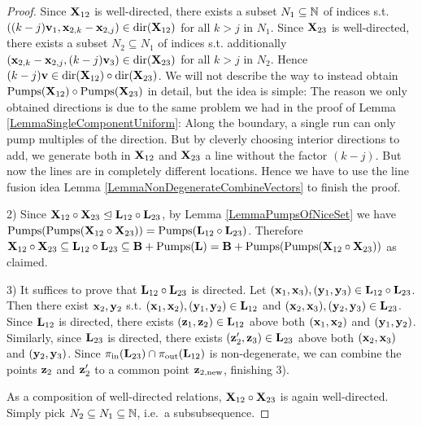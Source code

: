 \begin{proof}
Since \(\mathbf{X}_{12}\) is well-directed, there exists a subset \(N_1 \subseteq \mathbb{N}\) of indices s.t. \( ((k-j) \mathbf{v}_1, \mathbf{x}_{2,k}-\mathbf{x}_{2,j}) \in \operatorname{dir}(\mathbf{X}_{12})\) for all \(k>j\) in \(N_1\). Since \(\mathbf{X}_{23}\) is well-directed, there exists a subset \(N_2 \subseteq N_1\) of indices s.t. additionally \((\mathbf{x}_{2,k}-\mathbf{x}_{2,j}, (k-j) \mathbf{v}_3) \in \operatorname{dir}(\mathbf{X}_{23})\) for all \(k>j\) in \(N_2\). Hence \((k-j) \mathbf{v} \in \operatorname{dir}(\mathbf{X}_{12}) \circ \operatorname{dir}(\mathbf{X}_{23})\). We will not describe the way to instead obtain \(\operatorname{Pumps}(\mathbf{X}_{12}) \circ \operatorname{Pumps}(\mathbf{X}_{23})\) in detail, but the idea is simple: The reason we only obtained directions is due to the same problem we had in the proof of Lemma \ref{LemmaSingleComponentUniform}: Along the boundary, a single run can only pump multiples of the direction. But by cleverly choosing interior directions to add, we generate both in \(\mathbf{X}_{12}\) and \(\mathbf{X}_{23}\) a line without the factor \((k-j)\). But now the lines are in completely different locations. Hence we have to use the line fusion idea Lemma \ref{LemmaNonDegenerateCombineVectors} to finish the proof.



2) Since \(\mathbf{X}_{12} \circ \mathbf{X}_{23} \trianglelefteq \mathbf{L}_{12} \circ \mathbf{L}_{23}\), by Lemma \ref{LemmaPumpsOfNiceSet} we have \(\operatorname{Pumps}(\operatorname{Pumps}(\mathbf{X}_{12} \circ \mathbf{X}_{23}))=\operatorname{Pumps}(\mathbf{L}_{12} \circ \mathbf{L}_{23})\). Therefore \(\mathbf{X}_{12} \circ \mathbf{X}_{23} \subseteq \mathbf{L}_{12} \circ \mathbf{L}_{23}\subseteq \mathbf{B}+\operatorname{Pumps}(\mathbf{L})=\mathbf{B}+\operatorname{Pumps}(\operatorname{Pumps}(\mathbf{X}_{12} \circ \mathbf{X}_{23}))\) as claimed.

3) It suffices to prove that \(\mathbf{L}_{12} \circ \mathbf{L}_{23}\) is directed. Let \((\mathbf{x}_1, \mathbf{x}_3), (\mathbf{y}_1, \mathbf{y}_3) \in \mathbf{L}_{12} \circ \mathbf{L}_{23}\). Then there exist \(\mathbf{x}_2, \mathbf{y}_2\) s.t. \((\mathbf{x}_1, \mathbf{x}_2), (\mathbf{y}_1, \mathbf{y}_2) \in \mathbf{L}_{12}\) and \((\mathbf{x}_2, \mathbf{x}_3), (\mathbf{y}_2, \mathbf{y}_3) \in \mathbf{L}_{23}\). Since \(\mathbf{L}_{12}\) is directed, there exists \((\mathbf{z}_1, \mathbf{z}_2) \in \mathbf{L}_{12}\) above both \((\mathbf{x}_1, \mathbf{x}_2)\) and \((\mathbf{y}_1, \mathbf{y}_2)\). Similarly, since \(\mathbf{L}_{23}\) is directed, there exists \((\mathbf{z}_2', \mathbf{z}_3) \in \mathbf{L}_{23}\) above both \((\mathbf{x}_2, \mathbf{x}_3)\) and \((\mathbf{y}_2, \mathbf{y}_3)\). Since \(\pi_{\text{in}}(\mathbf{L}_{23}) \cap \pi_{\text{out}}(\mathbf{L}_{12})\) is non-degenerate, we can combine the points \(\mathbf{z}_2\) and \(\mathbf{z}_2'\) to a common point \(\mathbf{z}_{2,\text{new}}\), finishing 3).

As a composition of well-directed relations, \(\mathbf{X}_{12} \circ \mathbf{X}_{23}\) is again well-directed. Simply pick \(N_2 \subseteq N_1 \subseteq \mathbb{N}\), i.e.\ a subsubsequence.
\end{proof}

